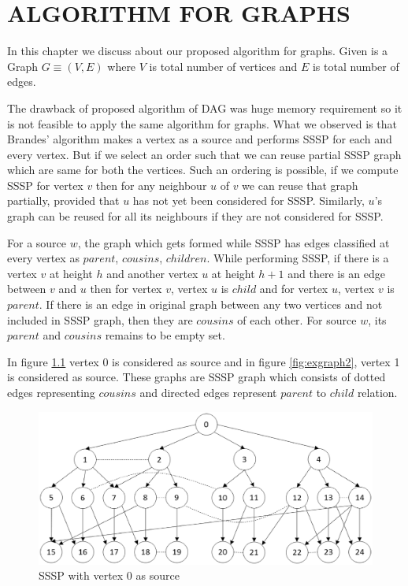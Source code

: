 \chapter{ALGORITHM FOR GRAPHS}
\label{chap:graph}
 
In this chapter we discuss about our proposed algorithm for graphs. 
Given is a Graph $G \equiv (V,E)$ where $V$ is total number of vertices and $E$ is total number of edges.

The drawback of proposed algorithm of DAG was huge memory requirement so it is not feasible to apply the same algorithm for graphs. 
What we observed is that Brandes' algorithm makes a vertex as a source and performs SSSP for each and every vertex. But if we select an order such that we can reuse partial SSSP graph which are same for both the vertices. Such an ordering is possible, if we compute SSSP for vertex $v$ then for any neighbour $u$ of $v$ we can reuse that graph partially, provided that $u$ has not yet been considered for SSSP. Similarly, $u$'s graph can be reused for all its neighbours if they are not considered for SSSP.

For a source $w$, the graph which gets formed while SSSP has edges classified at every vertex as $parent$, $cousins$, $children$.
While performing SSSP, if there is a vertex $v$ at height $h$ and another vertex $u$ at height $h+1$ and there is an edge between $v$ and $u$ then for vertex $v$, vertex $u$ is $child$ and for vertex $u$, vertex $v$ is $parent$.
If there is an edge in original graph between any two vertices and not included in SSSP graph, then they are $cousins$ of each other.
For source $w$, its $parent$ and $cousins$ remains to be empty set.

In figure \ref{fig:exgraph1} vertex 0 is considered as source and in figure \ref{fig:exgraph2}, vertex 1 is considered as source. These graphs are SSSP graph which consists of dotted edges representing $cousins$ and directed edges represent $parent$ to $child$ relation.

\begin{figure}
\hspace{-6.5em}
\includegraphics[width=21cm]{images/Slide1.eps}
\caption{SSSP with vertex 0 as source}
\label{fig:exgraph1}
\end{figure}

